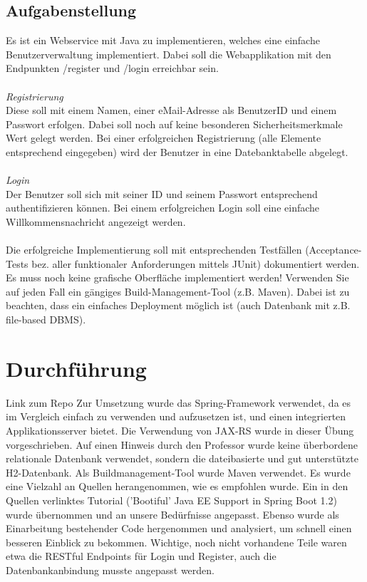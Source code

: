\documentclass[letterpaper, 12pt]{article}
\let\tempsection\section
\renewcommand\section[1]{\vspace{-0.3cm}\tempsection{#1}\vspace{-0.3cm}}
\let\tempsubsection\subsection
\renewcommand\subsection[1]{\vspace{0cm}\tempsubsection{#1}\vspace{0cm}}
\begin{document}
\subsection{Aufgabenstellung}
Es ist ein Webservice mit Java zu implementieren, welches eine einfache Benutzerverwaltung implementiert. Dabei soll die Webapplikation mit den Endpunkten /register und /login erreichbar sein. \\ \\
\textit{Registrierung} \\
Diese soll mit einem Namen, einer eMail-Adresse als BenutzerID und einem Passwort erfolgen. Dabei soll noch auf keine besonderen Sicherheitsmerkmale Wert gelegt werden. Bei einer erfolgreichen Registrierung (alle Elemente entsprechend eingegeben) wird der Benutzer in eine Datebanktabelle abgelegt. \\ \\
\textit{Login} \\
Der Benutzer soll sich mit seiner ID und seinem Passwort entsprechend authentifizieren können. Bei einem erfolgreichen Login soll eine einfache Willkommensnachricht angezeigt werden. \\ \\
Die erfolgreiche Implementierung soll mit entsprechenden Testfällen (Acceptance-Tests bez. aller funktionaler Anforderungen mittels JUnit) dokumentiert werden. Es muss noch keine grafische Oberfläche implementiert werden! Verwenden Sie auf jeden Fall ein gängiges Build-Management-Tool (z.B. Maven). Dabei ist zu beachten, dass ein einfaches Deployment möglich ist (auch Datenbank mit z.B. file-based DBMS).
\cite{eins, zwei, drei, vier}

\newpage

\section{Durchführung}

Link zum Repo \cite{repo} \newline
Zur Umsetzung wurde das Spring-Framework verwendet, da es im Vergleich einfach zu verwenden und aufzusetzen ist, und einen integrierten Applikationsserver bietet. Die Verwendung von JAX-RS wurde in dieser Übung vorgeschrieben. Auf einen Hinweis durch den Professor wurde keine überbordene relationale Datenbank verwendet, sondern die dateibasierte und gut unterstützte H2-Datenbank. Als Buildmanagement-Tool wurde Maven verwendet. Es wurde eine Vielzahl an Quellen herangenommen, wie es empfohlen wurde. Ein in den Quellen verlinktes Tutorial ('Bootiful' Java EE Support in Spring Boot 1.2) wurde übernommen und an unsere Bedürfnisse angepasst. Ebenso wurde als Einarbeitung bestehender Code hergenommen und analysiert, um schnell einen besseren Einblick zu bekommen. Wichtige, noch nicht vorhandene Teile waren etwa die RESTful Endpoints für Login und Register, auch die Datenbankanbindung musste angepasst werden. \cite{booti, spring, jaxrs, maven, hzwei, plugin, repoeins, repozwei}
\end{document}
